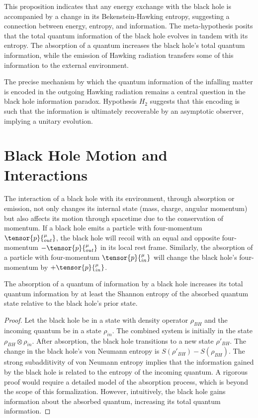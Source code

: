	This proposition indicates that any energy exchange with the black hole is accompanied by a change in its Bekenstein-Hawking entropy, suggesting a connection between energy, entropy, and information. The meta-hypothesis posits that the total quantum information of the black hole evolves in tandem with its entropy. The absorption of a quantum increases the black hole's total quantum information, while the emission of Hawking radiation transfers some of this information to the external environment.
	
	\begin{remark}
		The precise mechanism by which the quantum information of the infalling matter is encoded in the outgoing Hawking radiation remains a central question in the black hole information paradox. Hypothesis $H_2$ suggests that this encoding is such that the information is ultimately recoverable by an asymptotic observer, implying a unitary evolution.
	\end{remark}
	
	\section{Black Hole Motion and Interactions}
	
	The interaction of a black hole with its environment, through absorption or emission, not only changes its internal state (mass, charge, angular momentum) but also affects its motion through spacetime due to the conservation of momentum. If a black hole emits a particle with four-momentum $\tensor{p}{^\mu_{out}}$, the black hole will recoil with an equal and opposite four-momentum $-\tensor{p}{^\mu_{out}}$ in its local rest frame. Similarly, the absorption of a particle with four-momentum $\tensor{p}{^\mu_{in}}$ will change the black hole's four-momentum by $+\tensor{p}{^\mu_{in}}$.
	
	\begin{proposition}
		The absorption of a quantum of information by a black hole increases its total quantum information by at least the Shannon entropy of the absorbed quantum state relative to the black hole's prior state.
		\begin{proof}
			Let the black hole be in a state with density operator $\rho_{BH}$ and the incoming quantum be in a state $\rho_{in}$. The combined system is initially in the state $\rho_{BH} \otimes \rho_{in}$. After absorption, the black hole transitions to a new state $\rho'_{BH}$. The change in the black hole's von Neumann entropy is $S(\rho'_{BH}) - S(\rho_{BH})$. The strong subadditivity of von Neumann entropy implies that the information gained by the black hole is related to the entropy of the incoming quantum. A rigorous proof would require a detailed model of the absorption process, which is beyond the scope of this formalization. However, intuitively, the black hole gains information about the absorbed quantum, increasing its total quantum information.
		\end{proof}
	\end{proposition}
	
